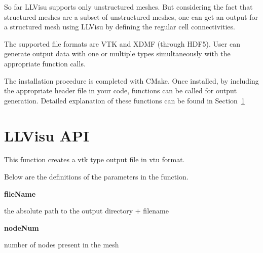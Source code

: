 \documentclass{article}
\begin{document}
So far LLVisu supports only unstructured meshes. But considering the fact that structured meshes are a subset of unstructured meshes, one can get an output for a structured mesh using LLVisu by defining the regular cell connectivities. 

The supported file formats are VTK\cite{VTK} and XDMF\cite{XDMF} (through HDF5\cite{HDF5}). User can generate output data with one or multiple types simultaneously with the appropriate function calls.

The installation procedure is completed with CMake\cite{CMake}. Once installed, by including the appropriate header file in your code, functions can be called for output generation. Detailed explanation of these functions can be found in Section~\ref{sec:API}


\newpage

\section{LLVisu API}
\label{sec:API}

\bigskip

        \par This function creates a vtk type output file in vtu format.
\bigskip
        
        \par Below are the definitions of the parameters in the function.
\medskip

        {\bf fileName}  \par the absolute path to the output directory + filename
\medskip
        
        {\bf nodeNum} \par number of nodes present in the mesh
\medskip
        
\end{document}
